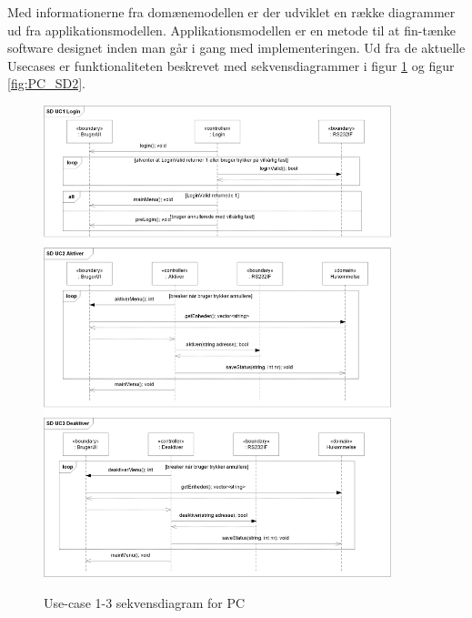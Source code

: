 Med informationerne fra domænemodellen er der udviklet en række diagrammer ud fra applikationsmodellen.
Applikationsmodellen er en metode til at fin-tænke software designet inden man går i gang med implementeringen. Ud fra de aktuelle Usecases er funktionaliteten beskrevet med sekvensdiagrammer i figur \ref{fig:PC_SD1} og figur \ref{fig:PC_SD2}.

\begin{figure}[H] \centering
     {\includegraphics[width=0.9\textwidth]{billeder/uml/PC_SD1}}
     \caption{Use-case 1-3 sekvensdiagram for PC}
     \label{fig:PC_SD1}
\end{figure}
\clearpage


